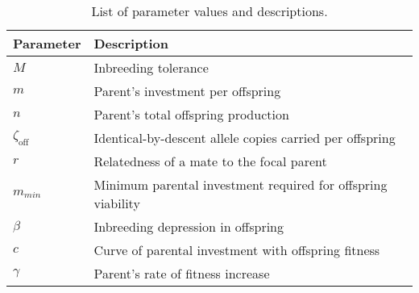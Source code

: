 \documentclass[12pt]{article}
\begin{document}
\clearpage
\singlespacing
\begin{table}[H]
\begin{center}
\begin{tabular}{ll}
\hline
Parameter & Description & \\
\hline
$M$                     & Inbreeding tolerance  & \\
$m$                     & Parent's investment per offspring & \\
$n$                     & Parent's total offspring production & \\
$\zeta_{\textrm{off}}$  & Identical-by-descent allele copies carried per offspring & \\
$r$                     & Relatedness of a mate to the focal parent & \\
$m_{min}$               & Minimum parental investment required for offspring viability & \\
$\beta$                 & Inbreeding depression in offspring & \\
$c$                     & Curve of parental investment with offspring fitness & \\
$\gamma$                & Parent's rate of fitness increase & \\
\hline	
\end{tabular}
\end{center}
\caption{List of parameter values and descriptions.}
\label{parameters}
\end{table}
\end{document}
